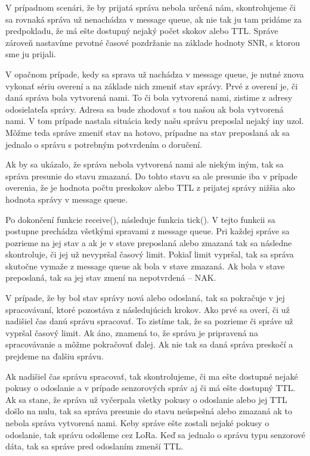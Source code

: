 \documentclass[slovak,master]{diploma}
\begin{document}
V prípadnom scenári, že by prijatá správa nebola určená nám, skontrolujeme či sa rovnaká správa už nenachádza v message queue, ak nie tak ju tam pridáme za predpokladu, že má ešte dostupný 
nejaký počet skokov alebo TTL. Správe zároveň nastavíme prvotné časové pozdržanie na základe hodnoty SNR, s ktorou sme ju prijali.

V opačnom prípade, kedy sa sprava už nachádza v message queue, je nutné znova vykonať sériu overení a na základe nich zmeniť stav správy.
Prvé z overení je, či daná správa bola vytvorená nami. To či bola vytvorená nami, zistime z adresy odosielateľa správy. Adresa sa bude zhodovať s tou našou ak bola vytvorená nami. 
V tom prípade nastala situácia kedy našu správu preposlal nejaký iny uzol. Môžme teda správe zmeniť stav na hotovo, prípadne na stav preposlaná ak sa jednalo o správu s potrebným 
potvrdením o doručení.

Ak by sa ukázalo, že správa nebola vytvorená nami ale niekým iným, tak sa správa presunie do stavu zmazaná. Do tohto stavu sa ale presunie iba v prípade overenia, že je hodnota počtu preskokov alebo TTL 
z prijatej správy nižšia ako hodnota správy v message queue. %

Po dokončení funkcie receive(), následuje funkcia tick(). V tejto funkcii sa postupne prechádza všetkými spravami z message queue. Pri každej správe sa pozrieme na jej stav 
a ak je v stave preposlaná alebo zmazaná tak sa následne skontroluje, či jej už nevypršal časový limit. Pokiaľ limit vypršal, tak sa správa 
skutočne vymaže z message queue ak bola v stave zmazaná. Ak bola v stave preposlaná, tak sa jej stav zmení na nepotvrdená -- NAK.

V prípade, že by bol stav správy nová alebo odoslaná, tak sa pokračuje v jej spracovávaní, ktoré pozostáva z následujúcich krokov.
Ako prvé sa overí, či už nadišiel čas danú správu spracovať. To zistíme tak, že sa pozrieme či správe už vypršal časový limit. Ak áno, znamená to, že správa je pripravená na spracovávanie 
a môžme pokračovať ďalej. Ak nie tak sa daná správa preskočí a prejdeme na ďalšiu správu.

Ak nadišiel čas správu spracovať, tak skontrolujeme, či ma ešte dostupné nejaké pokusy o odoslanie a v prípade senzorových správ aj či má ešte dostupný TTL.
Ak sa stane, že správa už vyčerpala všetky pokusy o odoslanie alebo jej TTL došlo na nulu, tak sa správa presunie do stavu neúspešná alebo zmazaná ak to nebola 
správa vytvorená nami. Keby správe ešte zostali nejaké pokusy o odoslanie, tak správu odošleme cez LoRa. Keď sa jednalo o správu typu senzorové dáta, tak sa správe pred 
odoslaním zmenší TTL.
\end{document}
